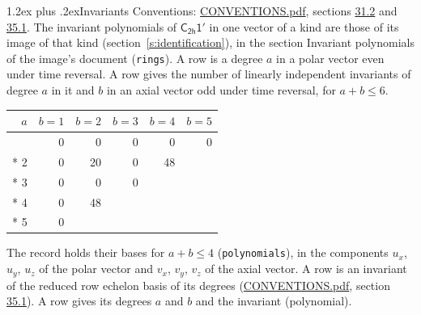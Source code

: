 \documentclass[10pt,a4paper]{article}
\makeatletter
\renewcommand\section{\@startsection{section}{1}{\z@}{-3ex plus -1ex minus -.2ex}%
  {1.2ex plus .2ex}{\normalfont\large\sffamily\bfseries\color{parttitle}}}
\numberwithin{equation}{section}
\newcommand{\grp}[1]{\mathsf{#1}}
\makeatother
\begin{document}
\section{Invariants}\label{s:invariants}
Conventions: \href{../../CONVENTIONS.pdf}{CONVENTIONS.pdf}, sections \href{../../CONVENTIONS.pdf\#conv.31.2}{31.2} and \href{../../CONVENTIONS.pdf\#conv.35.1}{35.1}.
The invariant polynomials of $\grp{C_{2h}1'}$ in one vector of a kind are those of its image of that kind (section~\ref{s:identification}), in the section Invariant polynomials of the image's document (\texttt{rings}).
\leavevmode\label{n:index.degree.polar}\label{n:index.degree.axial}A row is a degree $a$ in a polar vector even under time reversal. A row gives the number of linearly independent invariants of degree $a$ in it and $b$ in an axial vector odd under time reversal, for $a + b \le 6$.
{\small\begin{longtable}{@{}rrrrrr@{}}\toprule
$a$ & $b = 1$ & $b = 2$ & $b = 3$ & $b = 4$ & $b = 5$\\\midrule\endhead
\bottomrule\endfoot\endlastfoot
1 & 0 & 0 & 0 & 0 & 0\\*
2 & 0 & 20 & 0 & 48 & \\*
3 & 0 & 0 & 0 &  & \\*
4 & 0 & 48 &  &  & \\*
5 & 0 &  &  &  & \\
\bottomrule\end{longtable}}
\leavevmode\label{n:local.component.polar}\label{n:local.component.axial}The record holds their bases for $a + b \le 4$ (\texttt{polynomials}), in the components $u_{x}$, $u_{y}$, $u_{z}$ of the polar vector and $v_{x}$, $v_{y}$, $v_{z}$ of the axial vector. \label{n:head.polynomial}A row is an invariant of the reduced row echelon basis of its degrees (\href{../../CONVENTIONS.pdf}{CONVENTIONS.pdf}, section \href{../../CONVENTIONS.pdf\#conv.35.1}{35.1}). A row gives its degrees $a$ and $b$ and the invariant (polynomial).
\end{document}
